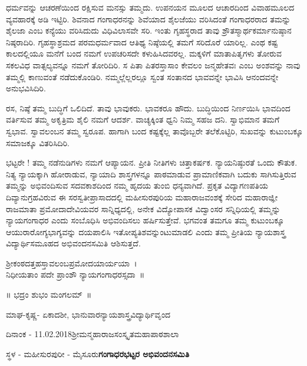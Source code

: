 {ಧರ್ಮವನ್ನು ಆಚರಣೆಯಿಂದ ರಕ್ಷಿಸುವ ಮನಸ್ಸು ತಮ್ಮದು. ಉಪನಯನ ಮೂಲದ ಆಚಾರದಿಂದ ವಿವಾಹಮೂಲದ ವ್ಯವಹಾರಕ್ಕೆ ಅಡಿ ಇಟ್ಟಿರಿ. ಶಿವನಾದ ಗಂಗಾಧರ\-ನನ್ನು ಶಿವೆಯಾದ ಶೈಲಜೆಯು ವರಿಸಿದಂತೆ ಗಂಗಾಧರರಾದ ತಮನ್ನು ಶೈಲಜಾ ಎಂಬ ಕನ್ಯೆಯು ವರಿಸಿದುದು ವಿಧಿವಿಲಾಸವೇ ಸರಿ. ಇಂತು ಗೃಹಸ್ಥರಾದ ತಾವು ಶ್ರೌತಸ್ಮಾರ್ಥಕರ್ಮಾನುಷ್ಠಾನ ನಿಷ್ಠರಾದಿರಿ. ಗೃಹಸ್ಥಾಶ್ರಮದ ಪರಮಧರ್ಮವಾದ ಆತಿಥ್ಯ ನಿಷ್ಠೆಯಲ್ಲಿ ತಮಗೆ ಸರಿದೊರೆ ಯಾರಿಲ್ಲ. ಎಂಥ ಕಷ್ಟ ಕಾಲದಲ್ಲಿಯೂ ಮನೆಗೆ ಬಂದ ನಮಗೆ ಉಪಚರಿಸದೇ ಕಳುಹಿಸಿದವರಲ್ಲ. ಮಕ್ಕಳಿಗೆ ಮಾತಾಪಿತೃಗಳು ತೋರುವ ಸಕಲವಿಧ ವಾತ್ಸಲ್ಯವನ್ನೂ ನಮಗೆ ತೋರಿದಿರಿ. ಸ ಪಿತಾ ಪಿತರಸ್ತಾಸಾಂ ಕೇವಲಂ ಜನ್ಮಹೇತವಃ ಎಂಬ ಅಂಶವನ್ನು ನಾವು ತಮ್ಮಲ್ಲಿ ಕಾಣುವಂತೆ ನಡೆದುಕೊಂಡಿರಿ. ನಮ್ಮಲ್ಲೆಲ್ಲರಲ್ಲೂ ಸ್ವಂತ ಸಂತಾನದ ಭಾವವನ್ನೇ ಭಾವಿಸಿ ಆನಂದವನ್ನೇ ಅನುಭವಿಸಿದಿರಿ. 

ರಸ, ನಿಷ್ಠೆ ತಮ್ಮ ಬುದ್ಧಿಗೆ ಒಲಿದಿದೆ. ತಾವು ಭಾವುಕರು. ಭಾವಕರೂ ಹೌದು. ಬುದ್ಧಿಯಿಂದ ನಿರ್ಣಯಿಸಿ ಭಾವದಿಂದ ವರ್ತಿಸುವ ತಮ್ಮ ಅಕೃತ್ರಿಮ ಶೈಲಿ ನಮಗೆ ಆದರ್ಶ. ವಾಚ್ಯಕ್ಕಿಂತ ಧ್ವನಿ ನಿಮ್ಮ ಸಹಜ ದನಿ.  ಸ್ವಾಭಿಮಾನ ತಮಗೆ ಸ್ವಭಾವ. ಸ್ವಾವಲಂಬನ ತಮ್ಮ ಸ್ವರೂಪ. ಹಾಗಾಗಿ ಬಂದ ಕಷ್ಟಕ್ಕೆಲ್ಲ ತಾವೊಬ್ಬರೇ ತಲೆಕೊಟ್ಟಿರಿ, ಸುಖವನ್ನು ಕುಟುಂಬಕ್ಕೂ ಸಮಾಜಕ್ಕೂ ವಿತರಿಸಿದಿರಿ.

ಭಟ್ಟರೇ ! ತಮ್ಮ ನಡೆನುಡಿಗಳು ನಮಗೆ ಆಪ್ಯಾಯನ. ಪ್ರೀತಿ ನೀತಿಗಳು ಚಿತ್ತಾಕರ್ಷಕ. ನ್ಯಾಯ\-ನಿಷ್ಠುರತೆ ಒಂದು ಕೌತುಕ.  ನಿತ್ಯ ನ್ಯಾಯಕ್ಕಾಗಿ ಹೋರಾಡುವ, ನ್ಯಾಯಾದಿ ಶಾಸ್ತ್ರಗಳನ್ನೂ ಪಾಠ\-ಮಾಡುವ ಪ್ರಾಮಾಣಿಕವಾಗಿ ಬದುಕು ಸಾಗಿಸುತ್ತಿರುವ ತಮ್ಮನ್ನು ಅಭಿವಂದಿಸುವ ಸದವಕಾಶದಿಂದ ನಮ್ಮ ಹೃದಯ ತುಂಬಿ ಧನ್ಯವಾಗಿದೆ. ಪ್ರಕೃತ ವಿದ್ಯಾಗಣಪತಿಯ ದಿವ್ಯಾನುಗ್ರಹವಿರುವ ಈ ಸರಸ್ವತೀಪ್ರಾಸಾದದಲ್ಲಿ ಮಹೀಸುರ\-ಪುರಿಯ ಮಹಾರಾಜವಂಶಕ್ಕೆ ಸೇರಿದ ಮಹಾರಾಜ್ಞೀ ರಾಜಮಾತಾ ಪ್ರಮೋದಾ\break ದೇವಿಯವರ ಸಾನ್ನಿಧ್ಯದಲ್ಲಿ, ಅನೇಕ ವಿದ್ಯೋಪಾಸಕ ವಿದ್ವಾಂಸರ ಸನ್ನಿಧಿ\-ಯಲ್ಲಿ ತಮ್ಮನ್ನು ನ್ಯಾಯ\-ಗಂಗಾಧರ ಎಂದು ಸಂಬೊಧಿಸಿ ಅಭಿವಂದಿಸಲು ಹರ್ಷಿಸು\-ತ್ತೇವೆ. ಭಗವಂತ ತಮಗೂ ತಮ್ಮ ಕುಟುಂಬಕ್ಕೂ ಆಯುರಾರೋಗ್ಯಭಾಗ್ಯವನ್ನು ದಯಪಾಲಿಸಿ ಇತೋಪ್ಯತಿಶವನ್ನುಂಟುಮಾಡಲಿ ಎಂದು ತಮ್ಮ ಪ್ರೀತಿಯ ನ್ಯಾಯಶಾಸ್ತ್ರ ವಿದ್ಯಾರ್ಥಿ\-ಸಮೂಹದ ಅಭಿವಂದನಸಮಿತಿ ಆಶಿಸುತ್ತದೆ.
\medskip


\begin{center}
ಶ್ರೀಕಂಠದತ್ತಹಸ್ತಾವಲಂಬಪ್ರಮೋದಯಾರ್ಯಯಾ~।\\
ನಿಧೀಯತಾಂ ಪದೇ ಪ್ರಾಂಶೌ ನ್ಯಾಯಗಂಗಾಧರಸ್ಸದಾ~॥
\end{center}

\centerline{॥ ಭದ್ರಂ ಶುಭಂ ಮಂಗಲಮ್~॥}
\bigskip

\noindent
ಮಾಘ-ಕೃಷ್ಣ- ಏಕಾದಶೀ, ಭಾನುವಾರ\hfill ನ್ಯಾಯಶಾಸ್ತ್ರವಿದ್ಯಾರ್ಥಿವೃಂದ

\noindent
ದಿನಾಂಕ - 11.02.2018\hfill ಶ್ರೀಮನ್ಮಹಾರಾಜಸಂಸ್ಕೃತಮಹಾಪಾಠಶಾಲಾ

\noindent
ಸ್ಥಳ - ಮಹೀಸುರಪುರೀ - ಮೈಸೂರು\hfill \textbf{ಗಂಗಾಧರಭಟ್ಟರ ಅಭಿವಂದನಸಮಿತಿ}
}
